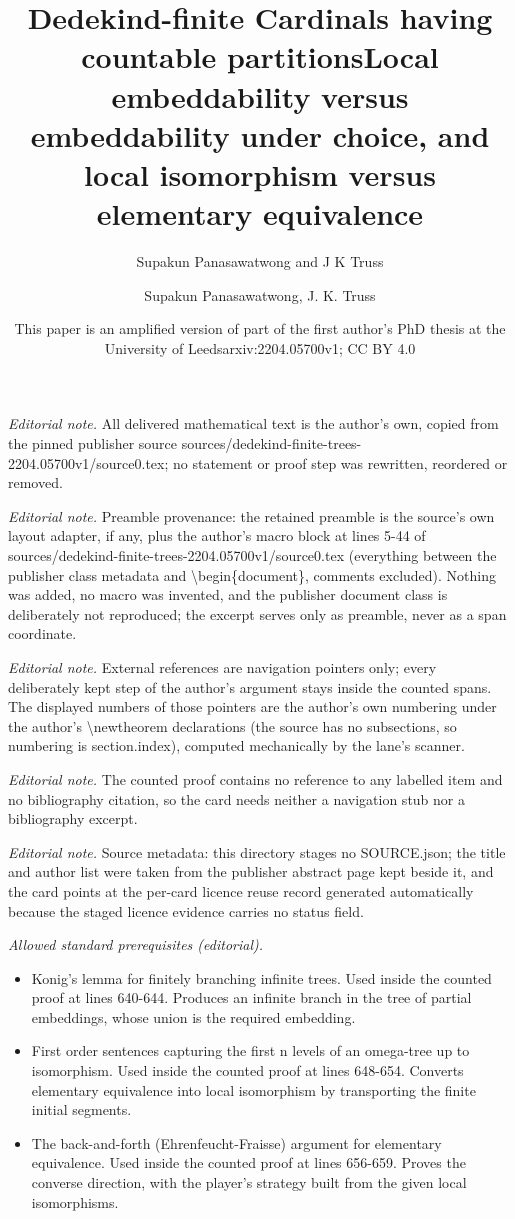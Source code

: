 \documentclass[10pt,a4paper]{amsart}
\title{Dedekind-finite Cardinals having countable partitions}
\author{Supakun Panasawatwong and J K Truss}
\date{This paper is an amplified version of part of the first author's PhD thesis at the University of Leeds}%
\title{Local embeddability versus embeddability under choice, and local isomorphism versus elementary equivalence}
\author{Supakun Panasawatwong, J. K. Truss}
\date{arxiv:2204.05700v1; CC BY 4.0}
\begin{document}
\maketitle
\noindent\textit{Editorial note.} All delivered mathematical text is the author's own, copied from the pinned publisher source sources/dedekind-finite-trees-2204.05700v1/source0.tex; no statement or proof step was rewritten, reordered or removed.\par\medskip
\noindent\textit{Editorial note.} Preamble provenance: the retained preamble is the source's own layout adapter, if any, plus the author's macro block at lines 5-44 of sources/dedekind-finite-trees-2204.05700v1/source0.tex (everything between the publisher class metadata and \textbackslash{}begin\{document\}, comments excluded). Nothing was added, no macro was invented, and the publisher document class is deliberately not reproduced; the excerpt serves only as preamble, never as a span coordinate.\par\medskip
\noindent\textit{Editorial note.} External references are navigation pointers only; every deliberately kept step of the author's argument stays inside the counted spans. The displayed numbers of those pointers are the author's own numbering under the author's \textbackslash{}newtheorem declarations (the source has no subsections, so numbering is section.index), computed mechanically by the lane's scanner.\par\medskip
\noindent\textit{Editorial note.} The counted proof contains no reference to any labelled item and no bibliography citation, so the card needs neither a navigation stub nor a bibliography excerpt.\par\medskip
\noindent\textit{Editorial note.} Source metadata: this directory stages no SOURCE.json; the title and author list were taken from the publisher abstract page kept beside it, and the card points at the per-card licence reuse record generated automatically because the staged licence evidence carries no status field.\par\medskip
\noindent\textit{Allowed standard prerequisites (editorial).}\begin{itemize}
\item Konig's lemma for finitely branching infinite trees. Used inside the counted proof at lines 640-644. Produces an infinite branch in the tree of partial embeddings, whose union is the required embedding.
\item First order sentences capturing the first n levels of an omega-tree up to isomorphism. Used inside the counted proof at lines 648-654. Converts elementary equivalence into local isomorphism by transporting the finite initial segments.
\item The back-and-forth (Ehrenfeucht-Fraisse) argument for elementary equivalence. Used inside the counted proof at lines 656-659. Proves the converse direction, with the player's strategy built from the given local isomorphisms.
\end{itemize}\medskip
\end{document}
